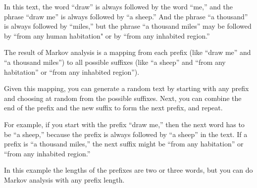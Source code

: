 %
In this text,
the word ``draw'' is always followed by the word ``me,'' and 
the phrase ``draw me'' is always followed by ``a sheep.'' And the 
phrase ``a thousand'' is always followed by ``miles,'' but the 
phrase ``a thousand miles'' may be followed by ``from any 
human habitation" or by ``from any inhabited region.''

The result of Markov analysis is a mapping from each prefix
(like ``draw me'' and ``a thousand miles'') to all possible 
suffixes
(like ``a sheep'' and ``from any habitation'' or ``from any inhabited region'').

Given this mapping, you can generate a random text by
starting with any prefix and choosing at random from the
possible suffixes.  Next, you can combine the end of the
prefix and the new suffix to form the next prefix, and repeat.

For example, if you start with the prefix ``draw me,'' then the
next word has to be ``a sheep,'' because the prefix is always 
followed by ``a sheep'' in the text.  If a prefix is ``a thousand 
miles,'' the next suffix might be ``from any habitation'' or ``from any inhabited region.''

In this example the lengths of the prefixes are two or three words, 
but you can do Markov analysis with any prefix length.


